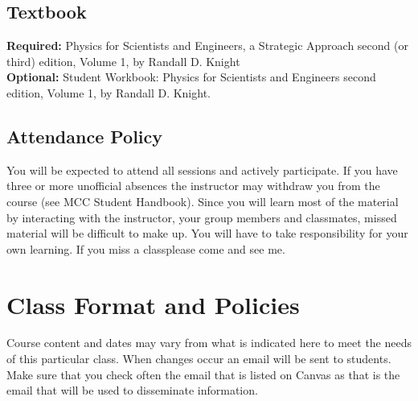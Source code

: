 \documentclass[12pt]{article}
\begin{document}
\subsection*{Textbook}
\textbf{Required:} Physics for Scientists and Engineers, a Strategic Approach second (or third) edition, Volume 1, by Randall D. Knight \\
\textbf{Optional:} Student Workbook: Physics for Scientists and Engineers second edition, Volume 1, by Randall D. Knight.


\subsection*{Attendance Policy}
You will be expected to attend all sessions and actively participate. If you have three or more unofficial absences the instructor may withdraw you from the course (see MCC Student Handbook). Since you will learn most of the material by interacting with the instructor, your group members and classmates, missed material will be difficult to make up. You will have to take responsibility for your own learning. If you miss a classplease come and see me.

\section*{Class Format and Policies}
Course content and dates may vary from what is indicated here to meet the needs of this particular class. When changes occur an email will be sent to students. Make sure that you check often the email that is listed on Canvas as that is the email that will be used to disseminate information.
\end{document}
